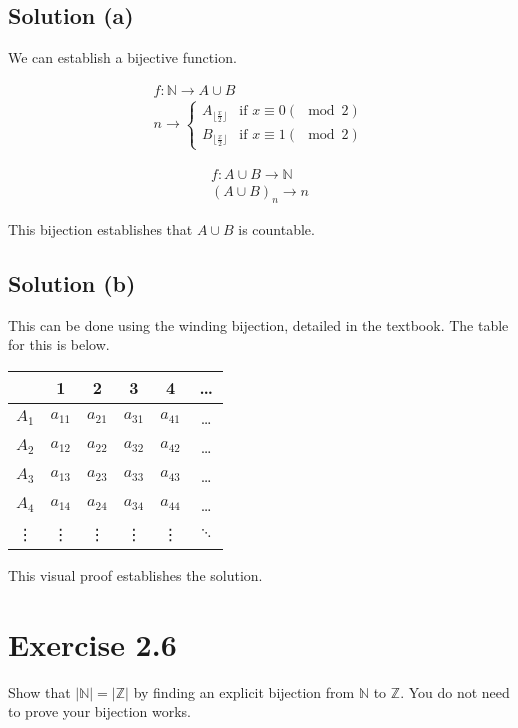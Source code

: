 \documentclass[12pt]{report}
\begin{document}
\subsection{Solution (a)}
We can establish a bijective function. 
\begin{multicols}{2}
    \begin{gather}
        f: \mathbb{N} \to A \cup B\\
        n \to \begin{cases}
            A_{\lfloor\frac{x}{2}\rfloor} & \text{if } x \equiv 0 (\mod 2)\\
            B_{\lfloor\frac{x}{2}\rfloor} & \text{if } x \equiv 1 (\mod 2)
        \end{cases}
    \end{gather}
    
    \columnbreak
    \begin{gather}
        f: A \cup B \to \mathbb{N}\\
        (A \cup B)_n \to n
    \end{gather}
\end{multicols}

This bijection establishes that $A \cup B$ is countable.

\subsection{Solution (b)}
This can be done using the winding bijection, detailed in the textbook.
The table for this is below.
\begin{center}
    \begin{tabular}{c| c c c c c}
            &1  &2  &3  &4  &\dots\\
        \hline
        $A_1$ &$a_{11}$    &$a_{21}$    &$a_{31}$   &$a_{41}$   &\dots\\
        $A_2$ &$a_{12}$    &$a_{22}$    &$a_{32}$   &$a_{42}$   &\dots\\
        $A_3$ &$a_{13}$    &$a_{23}$    &$a_{33}$   &$a_{43}$   &\dots\\
        $A_4$ &$a_{14}$    &$a_{24}$    &$a_{34}$   &$a_{44}$   &\dots\\
        \vdots  &\vdots    &\vdots      &\vdots     &\vdots     &$\ddots$
    \end{tabular}
\end{center}
This visual proof establishes the solution.

\pagebreak
\section{Exercise 2.6}
Show that $|\mathbb{N}| = |\mathbb{Z}|$ by finding an explicit bijection  from $\mathbb{N}$ to $\mathbb{Z}$. You do not need to prove your bijection works. 
\end{document}
